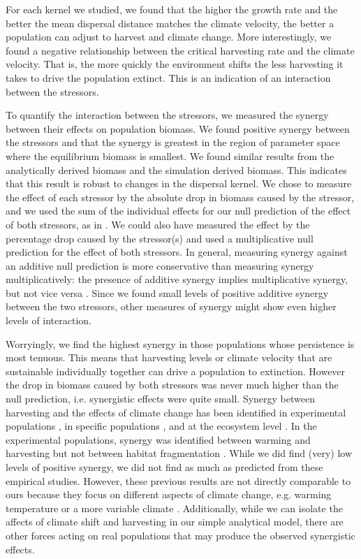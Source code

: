 \documentclass[12pt,english]{article}
\begin{document}
\begin{spacing}{1.9}
\begin{flushleft}
For each kernel we studied, we found that the higher the growth rate and the better the mean dispersal distance matches the climate velocity, the better a population can adjust to harvest and climate change.  More interestingly, we found a negative relationship between the critical harvesting rate and the climate velocity.  That is, the more quickly the environment shifts the less harvesting it takes to drive the population extinct.  This is an indication of an interaction between the stressors. 

To quantify the interaction between the stressors, we measured the synergy between their effects on population biomass.  We found positive synergy between the stressors and that the synergy is greatest in the region of parameter space where the equilibrium biomass is smallest.  We found similar results from the analytically derived biomass and the simulation derived biomass. This indicates that this result is robust to changes in the dispersal kernel.  We chose to measure the effect of each stressor by the absolute drop in biomass caused by the stressor, and we used the sum of the individual effects for our null prediction of the effect of both stressors, as in \cite{Crainetal2008, DarlingCote2008,Nyeetal2013}.  We could also have measured the effect by the percentage drop caused by the stressor(s) and used a multiplicative null prediction for the effect of both stressors.  In general, measuring synergy against an additive null prediction is more conservative than measuring synergy multiplicatively: the presence of additive synergy implies multiplicative synergy, but not vice versa \citep{Crainetal2008, Foltetal1999}.  Since we found small levels of positive additive synergy between the two stressors, other measures of synergy might show even higher levels of interaction. 


Worryingly, we find the highest synergy in those populations whose persistence is most tenuous.  This means that harvesting levels or climate velocity that are sustainable individually together can drive a population to extinction.  However the drop in biomass caused by both stressors was never much higher than the null prediction, i.e. synergistic effects were quite small. %
Synergy between harvesting and the effects of climate change has been identified in experimental populations \citep{Moraetal2007}, in specific populations \citep{Planque:2010uq}, and at the ecosystem level \citep{Kirby:2009fk,Planque:2010uq}.   In the experimental populations, synergy was identified between warming and harvesting but not between habitat fragmentation \citep{Moraetal2007}.    While we did find (very) low levels of positive synergy, we did not find as much as predicted from these empirical studies.  However, these previous results are not directly comparable to ours because they focus on different aspects of climate change, e.g. warming temperature \citep{Moraetal2007,Kirby:2009fk} or a more variable climate \citep{Planque:2010uq}.  Additionally, while we can isolate the affects of climate shift and harvesting in our simple analytical model, there are other forces acting on real populations that may produce the observed synergistic effects.



\end{flushleft}
\end{spacing}
\end{document}
